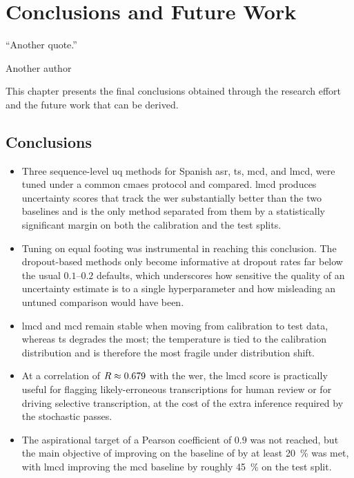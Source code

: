 \chapter{Conclusions and Future Work}
\epigraph{``Another quote.''}{\vspace{10pt}Another author}
\label{chapter:conclusions-fw}

\newpage

This chapter presents the final conclusions obtained through the research effort and the future work that can be derived.

\section{Conclusions}

\begin{itemize}

    \item Three sequence-level \acrshort{uq} methods for Spanish \acrshort{asr}, \acrshort{ts}, \acrshort{mcd}, and \acrshort{lmcd}, were tuned under a common \acrshort{cmaes} protocol and compared. \acrshort{lmcd} produces uncertainty scores that track the \acrshort{wer} substantially better than the two baselines and is the only method separated from them by a statistically significant margin on both the calibration and the test splits.

    \item Tuning on equal footing was instrumental in reaching this conclusion. The dropout-based methods only become informative at dropout rates far below the usual $0.1$--$0.2$ defaults, which underscores how sensitive the quality of an uncertainty estimate is to a single hyperparameter and how misleading an untuned comparison would have been.

    \item \acrshort{lmcd} and \acrshort{mcd} remain stable when moving from calibration to test data, whereas \acrshort{ts} degrades the most; the temperature is tied to the calibration distribution and is therefore the most fragile under distribution shift.

    \item At a correlation of $R \approx 0.679$ with the \acrshort{wer}, the \acrshort{lmcd} score is practically useful for flagging likely-erroneous transcriptions for human review or for driving selective transcription, at the cost of the extra inference required by the stochastic passes.

    \item The aspirational target of a Pearson coefficient of $0.9$ was not reached, but the main objective of improving on the baseline of \cite{rodriguez2024uncertainty} by at least \qty{20}{\percent} was met, with \acrshort{lmcd} improving the \acrshort{mcd} baseline by roughly \qty{45}{\percent} on the test split.

\end{itemize}


